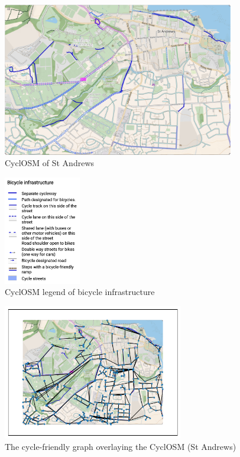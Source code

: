 \documentclass[12pt,a4paper]{report}
\begin{document}
\begin{figure}[ht!]
    \centering
    \includegraphics[width=0.9\textwidth]{diss_images/eval/cyclosm_st_andrews.png}
    \caption{CyclOSM of St Andrews}
    \label{fig:cyclosm st andrews}
\end{figure}

\begin{figure}[ht!]
    \centering
    \includegraphics[width=0.3\textwidth]{diss_images/eval/cyclosm_legend.png}
    \caption{CyclOSM legend of bicycle infrastructure}
    \label{fig:cyclosm legend}
\end{figure}

\begin{figure}[ht]
    \centering
    \includegraphics[width=0.7\textwidth,trim={1cm 1cm 1cm 1cm},clip]{diss_images/eval/overlay_st_andrews.png}
    \caption{The cycle-friendly graph overlaying the CyclOSM (St Andrews)}
    \label{fig:overlay st andrews}
\end{figure}
\end{document}
